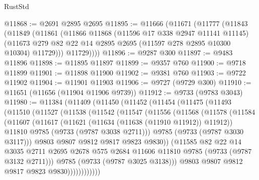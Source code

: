 \begin{lexlean}{RustStd}
\begin{coremodule}
{\begin{coremodule}
{{{{{{{{{{{{{{{{{{{{{{{{{{{{{{{{{{{{{{{{{{{{{{{{{{{{{{{@11868 := @2691 @2895 @2695
@11895 := @11666
    (@11671
      (@11777
        (@11843
          (@11849
            (@11861
              (@11866
                @11868
                (@11596 @17 @338 @2947 @11141 @11145)
                (@11673 @279 @82 @22 @14 @2895 @2695 (@11597 @278 @2895 @10300 @10304) @11729)))
            @11729))))
@11896 := @9287 @300
@11897 := @9483 @11896
@11898 := @11895 @11897
@11899 := @9357 @760
@11900 := @9718 @11899
@11901 := @11898 @11900
@11902 := @9381 @760
@11903 := @9722 @11902
@11904 := @11901 @11903
@11906 := @9727 (@9729 @300)
@11910 := @11651 (@11656 (@11904 @11906 @9739))
@11912 := @9733 (@9783 @3043)
@11980 := @11384
    (@11409
      (@11450
        (@11452
          (@11454
            (@11475
              (@11493
                (@11510
                  (@11527
                    (@11538
                      (@11542
                        (@11547
                          (@11556
                            (@11568
                              (@11578
                                (@11584
                                  (@11607
                                    (@11617
                                      (@11621 (@11634 (@11638 (@11910 @11912)) @11912))
                                      @11810
                                      @9785
                                      (@9733 (@9787 @3038 @2711)))
                                    @9785
                                    (@9733 (@9787 @3030 @3117)))
                                  @9803
                                  @9807
                                  @9812
                                  @9817
                                  @9823
                                  @9830))
                              (@11585
                                @82
                                @22
                                @14
                                @3035
                                @2711
                                @2695
                                @2678
                                @575
                                @2684
                                @11606
                                @11810
                                @9785
                                (@9733 (@9787 @3132 @2711)))
                              @9785
                              (@9733 (@9787 @3025 @3138)))
                            @9803
                            @9807
                            @9812
                            @9817
                            @9823
                            @9830))))))))))))
}}}}}}}}}}}}}}}}}}}}}}}}}}}}}}}}}}}}}}}}}}}}}}}}}}}}}}}
\end{coremodule}}
\end{coremodule}
\end{lexlean}
